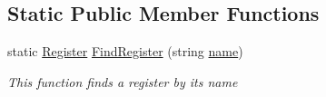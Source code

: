 \subsection*{Static Public Member Functions}
\begin{DoxyCompactItemize}
\item 
static \hyperlink{class_c_p_u___o_s___simulator_1_1_c_p_u_1_1_register}{Register} \hyperlink{class_c_p_u___o_s___simulator_1_1_c_p_u_1_1_register_a2048bfb660e7792cbaae83370a3b2606}{Find\+Register} (string \hyperlink{class_c_p_u___o_s___simulator_1_1_c_p_u_1_1_register_a1d9405f19dc212f0ff3d3307469451db}{name})
\begin{DoxyCompactList}\small\item\em This function finds a register by its name \end{DoxyCompactList}\end{DoxyCompactItemize}

